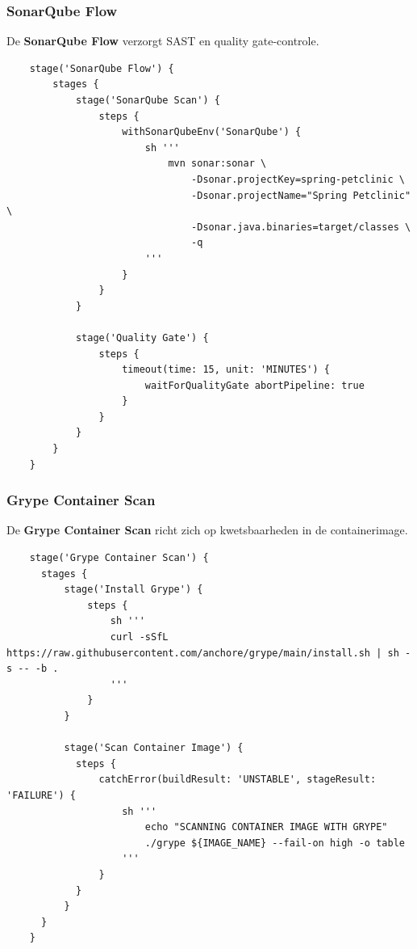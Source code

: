 \subsubsection{SonarQube Flow}

De \textbf{SonarQube Flow} verzorgt SAST en quality gate-controle.

\begin{listing}[h]
    \caption{SonarQube scan en quality gate}
    \label{lst:jenkins-sonarqube}
    \begin{verbatim}
    stage('SonarQube Flow') {
        stages {
            stage('SonarQube Scan') {
                steps {
                    withSonarQubeEnv('SonarQube') {
                        sh '''
                            mvn sonar:sonar \
                                -Dsonar.projectKey=spring-petclinic \
                                -Dsonar.projectName="Spring Petclinic" \
                                -Dsonar.java.binaries=target/classes \
                                -q
                        '''
                    }
                }
            }
    
            stage('Quality Gate') {
                steps {
                    timeout(time: 15, unit: 'MINUTES') {
                        waitForQualityGate abortPipeline: true
                    }
                }
            }
        }
    }
    \end{verbatim}
\end{listing}
\FloatBarrier

\subsubsection{Grype Container Scan}
De \textbf{Grype Container Scan} richt zich op kwetsbaarheden in de containerimage.

\begin{listing}[h]
    \caption{Container image scanning met Grype}
    \label{lst:jenkins-grype}
    \begin{verbatim}
    stage('Grype Container Scan') {
      stages {
          stage('Install Grype') {
              steps {
                  sh '''
                  curl -sSfL https://raw.githubusercontent.com/anchore/grype/main/install.sh | sh -s -- -b .
                  '''
              }
          }
    
          stage('Scan Container Image') {
            steps {
                catchError(buildResult: 'UNSTABLE', stageResult: 'FAILURE') {
                    sh '''
                        echo "SCANNING CONTAINER IMAGE WITH GRYPE"
                        ./grype ${IMAGE_NAME} --fail-on high -o table
                    '''
                }
            }
          }
      }
    }
    \end{verbatim}
\end{listing}
\FloatBarrier

